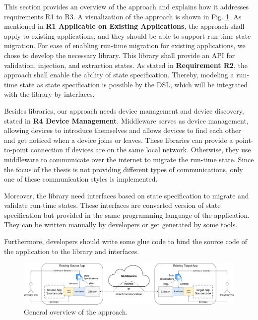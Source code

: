This section provides an overview of the approach and explains how it addresses requirements R1 to R3.
A visualization of the approach is shown in Fig. \ref{fig:solution-overview}. As mentioned in \textbf{R1 Applicable on Existing Applications}, the approach shall apply to existing applications, and they should be able to support run-time state migration. For ease of enabling run-time migration for existing applications, we chose to develop the necessary library. This library shall provide an API for validation, injection, and extraction states. As stated in \textbf{Requirement R2}, the approach shall enable the ability of state specification. Thereby, modeling a run-time state as state specification is possible by the DSL, which will be integrated with the library by interfaces.

Besides libraries, our approach needs device management and device discovery, stated in \textbf{R4 Device Management}. Middleware serves as device management, allowing devices to introduce themselves and allows devices to find each other and get noticed when a device joins or leaves. These libraries can provide a point-to-point connection if devices are on the same local network. Otherwise, they use middleware to communicate over the internet to migrate the run-time state. Since the focus of the thesis is not providing different types of communications, only one of these communication styles is implemented.

Moreover, the library need interfaces based on state specification to migrate and validate run-time states. These interfaces are converted version of state specification but provided in the same programming language of the application. They can be written manually by developers or get generated by some tools.

Furthermore, developers should write some glue code to bind the source code of the application to the library and interfaces.

\vspace{10mm}
\FloatBarrier
\begin{figure}[H]
    \includegraphics[width=\linewidth]{../figures/solution-overview.pdf}
    \centering
    \caption{General overview of the approach.}
    \label{fig:solution-overview}
\end{figure}
\FloatBarrier